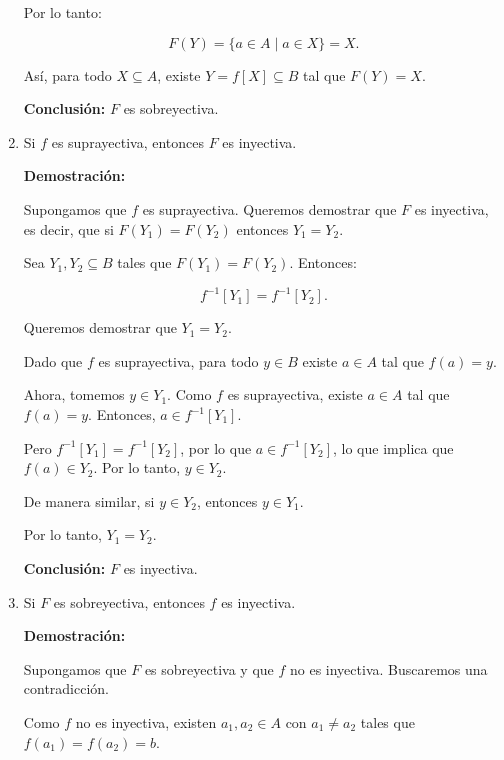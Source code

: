 \begin{solution}
\begin{enumerate}
        Por lo tanto:
        
        \[
        F(Y) = \{ a \in A \mid a \in X \} = X.
        \]
        
        Así, para todo \( X \subseteq A \), existe \( Y = f[X] \subseteq B \) tal que \( F(Y) = X \).
        
        \textbf{Conclusión:} \( F \) es sobreyectiva.
        
        \item Si \( f \) es suprayectiva, entonces \( F \) es inyectiva.
        
        \textbf{Demostración:}
        
        Supongamos que \( f \) es suprayectiva. Queremos demostrar que \( F \) es inyectiva, es decir, que si \( F(Y_1) = F(Y_2) \) entonces \( Y_1 = Y_2 \).
        
        Sea \( Y_1, Y_2 \subseteq B \) tales que \( F(Y_1) = F(Y_2) \). Entonces:
        
        \[
        f^{-1}[Y_1] = f^{-1}[Y_2].
        \]
        
        Queremos demostrar que \( Y_1 = Y_2 \).
        
        Dado que \( f \) es suprayectiva, para todo \( y \in B \) existe \( a \in A \) tal que \( f(a) = y \).
        
        Ahora, tomemos \( y \in Y_1 \). Como \( f \) es suprayectiva, existe \( a \in A \) tal que \( f(a) = y \). Entonces, \( a \in f^{-1}[Y_1] \).
        
        Pero \( f^{-1}[Y_1] = f^{-1}[Y_2] \), por lo que \( a \in f^{-1}[Y_2] \), lo que implica que \( f(a) \in Y_2 \). Por lo tanto, \( y \in Y_2 \).
        
        De manera similar, si \( y \in Y_2 \), entonces \( y \in Y_1 \).
        
        Por lo tanto, \( Y_1 = Y_2 \).
        
        \textbf{Conclusión:} \( F \) es inyectiva.
        
        \item Si \( F \) es sobreyectiva, entonces \( f \) es inyectiva.
        
        \textbf{Demostración:}
        
        Supongamos que \( F \) es sobreyectiva y que \( f \) no es inyectiva. Buscaremos una contradicción.
        
        Como \( f \) no es inyectiva, existen \( a_1, a_2 \in A \) con \( a_1 \neq a_2 \) tales que \( f(a_1) = f(a_2) = b \).
        

\end{enumerate}
\end{solution}
